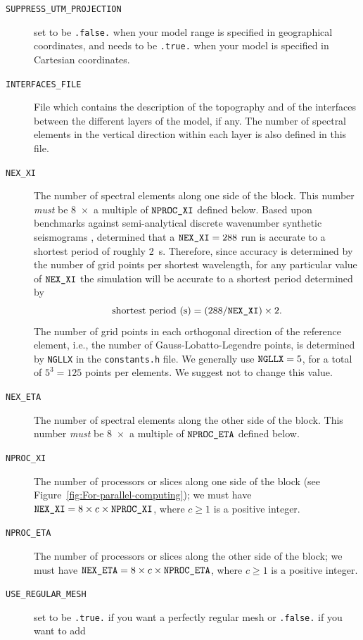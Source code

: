 \begin{description}
\item [{\texttt{SUPPRESS\_UTM\_PROJECTION}}] set to be \texttt{.false.}
when your model range is specified in geographical coordinates, and
needs to be \texttt{.true.} when your model is specified in Cartesian
coordinates. 
%
\item [{\texttt{INTERFACES\_FILE }}] File which contains the description
of the topography and of the interfaces between the different layers
of the model, if any. The number of spectral elements in the vertical
direction within each layer is also defined in this file.
%
\item [{\texttt{NEX\_XI}}] The number of spectral elements along one side of the
block. This number \textit{must} be 8~$\times$~a multiple of $\mbox{\texttt{NPROC\_XI\/}}$
defined below. Based upon benchmarks against semi-analytical discrete
wavenumber synthetic seismograms \citep{KoLiTrSuStSh04}, determined
that a $\mbox{\texttt{NEX\_XI\/}}=288$ run is accurate to a shortest period of roughly
2~s. Therefore, since accuracy is determined by the number of grid
points per shortest wavelength, for any particular value of $\mbox{\texttt{NEX\_XI\/}}$
the simulation will be accurate to a shortest period determined by
\begin{equation}
\mbox{shortest period (s)}=(288/\mbox{\texttt{NEX\_XI\/}})\times2.\label{eq:shortest_period}
\end{equation}
 The number of grid points in each orthogonal direction of the reference
element, i.e., the number of Gauss-Lobatto-Legendre points, is determined
by \texttt{NGLLX} in the \texttt{constants.h} file. We generally use
$\mbox{\texttt{NGLLX\/}}=5$, for a total of $5^{3}=125$ points per
elements. We suggest not to change this value.
%
\item [{\texttt{NEX\_ETA}}] The number of spectral elements along the other side
of the block. This number \textit{must} be 8~$\times$~a multiple
of $\mbox{\texttt{NPROC\_ETA\/}}$ defined below.
%
\item [{\texttt{NPROC\_XI}}] The number of processors or slices along one side
of the block (see Figure~\ref{fig:For-parallel-computing}); we must
have $\mbox{\texttt{NEX\_XI\/}}=8\times c\times\mbox{\texttt{NPROC\_XI\/}}$, where $c\ge1$ is a positive
integer.
%
\item [{\texttt{NPROC\_ETA}}] The number of processors or slices along the other
side of the block; we must have $\mbox{\texttt{NEX\_ETA\/}}=8\times c\times\mbox{\texttt{NPROC\_ETA\/}}$,
where $c\ge1$ is a positive integer.
%
\item [{\texttt{USE\_REGULAR\_MESH}}] set to be \texttt{.true.} if you
want a perfectly regular mesh or \texttt{.false.} if you want to add

\end{description}
